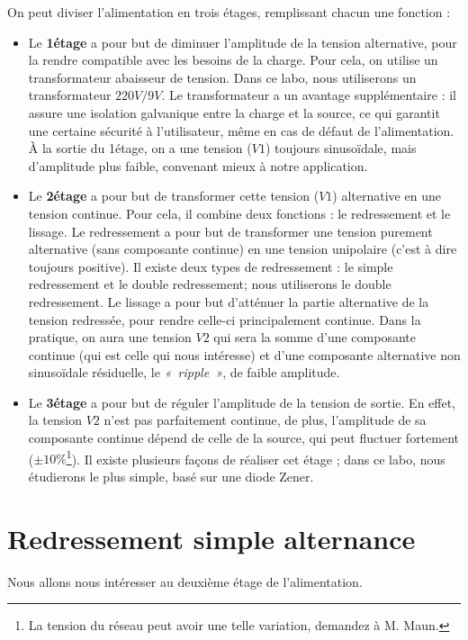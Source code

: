 \documentclass{../template/labo}
\begin{document}
On peut diviser l'alimentation en trois étages, remplissant chacun une fonction :
\begin{itemize}
\item Le \textbf{1\ier étage} a pour but de diminuer l'amplitude de la tension alternative, pour la rendre compatible avec les besoins de la charge. Pour cela, on utilise un transformateur abaisseur de tension.
Dans ce labo, nous utiliserons un transformateur $220V/9V$.
Le transformateur a un avantage supplémentaire : il assure une isolation galvanique entre la charge et la source, ce qui garantit une certaine sécurité à l'utilisateur, même en cas de défaut de l'alimentation.
À la sortie du 1\ier étage, on a une tension ($V1$) toujours sinusoïdale, mais d'amplitude plus faible, convenant mieux à notre application.

\item Le \textbf{2\ieme étage} a pour but de transformer cette tension ($V1$) alternative en une tension continue. Pour cela, il combine deux fonctions : le redressement et le lissage.
Le redressement a pour but de transformer une tension purement alternative (sans composante continue) en une tension unipolaire (c'est à dire toujours positive). Il existe deux types de redressement : le simple redressement et le double redressement; nous utiliserons le double redressement.
Le lissage a pour but d'atténuer la partie alternative de la tension redressée, pour rendre celle-ci principalement continue.
Dans la pratique, on aura une tension $V2$ qui sera la somme d'une composante continue (qui est celle qui nous intéresse) et d'une composante alternative non sinusoïdale résiduelle, le \textit{«~ripple~»}, de faible amplitude.

\item Le \textbf{3\ieme étage} a pour but de réguler l'amplitude de la tension de sortie. En effet, la tension $V2$ n'est pas parfaitement continue, de plus, l'amplitude de sa composante continue dépend de celle de la source, qui peut fluctuer fortement ($\pm10\%$\footnote{La tension du réseau peut avoir une telle variation, demandez à M. Maun.}). %
Il existe plusieurs façons de réaliser cet étage ; dans ce labo, nous étudierons le plus simple, basé sur une diode Zener.
\end{itemize}


\newpage
\section{Redressement simple alternance}
Nous allons nous intéresser au deuxième étage de l'alimentation.
\end{document}
